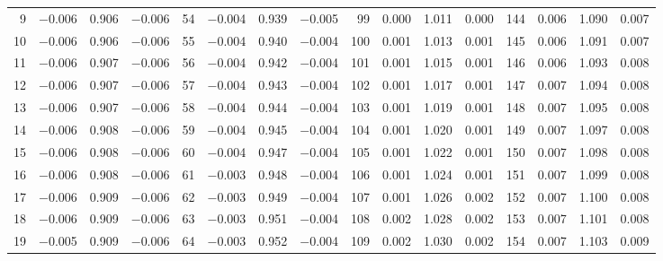 \begin{table}[!h]
{\begin{tabular}{rrrr|rrrr|rrrr|crrr}
  9 & \tiny{ $-$0.006} &   0.906 & \tiny{ $-$0.006} &  54 & \tiny{ $-$0.004} &   0.939 & \tiny{ $-$0.005} &  99 & \tiny{  0.000} &   1.011 & \tiny{  0.000} & 144 & \tiny{  0.006} &   1.090 & \tiny{  0.007}\\
 10 & \tiny{ $-$0.006} &   0.906 & \tiny{ $-$0.006} &  55 & \tiny{ $-$0.004} &   0.940 & \tiny{ $-$0.004} & 100 & \tiny{  0.001} &   1.013 & \tiny{  0.001} & 145 & \tiny{  0.006} &   1.091 & \tiny{  0.007}\\
 11 & \tiny{ $-$0.006} &   0.907 & \tiny{ $-$0.006} &  56 & \tiny{ $-$0.004} &   0.942 & \tiny{ $-$0.004} & 101 & \tiny{  0.001} &   1.015 & \tiny{  0.001} & 146 & \tiny{  0.006} &   1.093 & \tiny{  0.008}\\
 12 & \tiny{ $-$0.006} &   0.907 & \tiny{ $-$0.006} &  57 & \tiny{ $-$0.004} &   0.943 & \tiny{ $-$0.004} & 102 & \tiny{  0.001} &   1.017 & \tiny{  0.001} & 147 & \tiny{  0.007} &   1.094 & \tiny{  0.008}\\
 13 & \tiny{ $-$0.006} &   0.907 & \tiny{ $-$0.006} &  58 & \tiny{ $-$0.004} &   0.944 & \tiny{ $-$0.004} & 103 & \tiny{  0.001} &   1.019 & \tiny{  0.001} & 148 & \tiny{  0.007} &   1.095 & \tiny{  0.008}\\
 14 & \tiny{ $-$0.006} &   0.908 & \tiny{ $-$0.006} &  59 & \tiny{ $-$0.004} &   0.945 & \tiny{ $-$0.004} & 104 & \tiny{  0.001} &   1.020 & \tiny{  0.001} & 149 & \tiny{  0.007} &   1.097 & \tiny{  0.008}\\
 15 & \tiny{ $-$0.006} &   0.908 & \tiny{ $-$0.006} &  60 & \tiny{ $-$0.004} &   0.947 & \tiny{ $-$0.004} & 105 & \tiny{  0.001} &   1.022 & \tiny{  0.001} & 150 & \tiny{  0.007} &   1.098 & \tiny{  0.008}\\
 16 & \tiny{ $-$0.006} &   0.908 & \tiny{ $-$0.006} &  61 & \tiny{ $-$0.003} &   0.948 & \tiny{ $-$0.004} & 106 & \tiny{  0.001} &   1.024 & \tiny{  0.001} & 151 & \tiny{  0.007} &   1.099 & \tiny{  0.008}\\
 17 & \tiny{ $-$0.006} &   0.909 & \tiny{ $-$0.006} &  62 & \tiny{ $-$0.003} &   0.949 & \tiny{ $-$0.004} & 107 & \tiny{  0.001} &   1.026 & \tiny{  0.002} & 152 & \tiny{  0.007} &   1.100 & \tiny{  0.008}\\
 18 & \tiny{ $-$0.006} &   0.909 & \tiny{ $-$0.006} &  63 & \tiny{ $-$0.003} &   0.951 & \tiny{ $-$0.004} & 108 & \tiny{  0.002} &   1.028 & \tiny{  0.002} & 153 & \tiny{  0.007} &   1.101 & \tiny{  0.008}\\
 19 & \tiny{ $-$0.005} &   0.909 & \tiny{ $-$0.006} &  64 & \tiny{ $-$0.003} &   0.952 & \tiny{ $-$0.004} & 109 & \tiny{  0.002} &   1.030 & \tiny{  0.002} & 154 & \tiny{  0.007} &   1.103 & \tiny{  0.009}\\

\end{tabular}}
\end{table}
